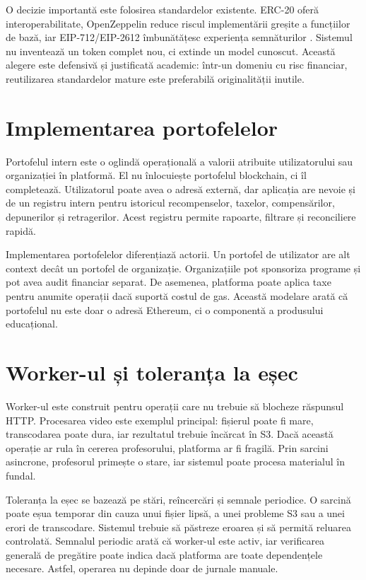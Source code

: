 O decizie importantă este folosirea standardelor existente. ERC-20 oferă interoperabilitate, OpenZeppelin reduce riscul implementării greșite a funcțiilor de bază, iar EIP-712/EIP-2612 îmbunătățesc experiența semnăturilor \cite{openzeppelinERC20,eip712,eip2612}. Sistemul nu inventează un token complet nou, ci extinde un model cunoscut. Această alegere este defensivă și justificată academic: într-un domeniu cu risc financiar, reutilizarea standardelor mature este preferabilă originalității inutile.

\section{Implementarea portofelelor}
Portofelul intern este o oglindă operațională a valorii atribuite utilizatorului sau organizației în platformă. El nu înlocuiește portofelul blockchain, ci îl completează. Utilizatorul poate avea o adresă externă, dar aplicația are nevoie și de un registru intern pentru istoricul recompenselor, taxelor, compensărilor, depunerilor și retragerilor. Acest registru permite rapoarte, filtrare și reconciliere rapidă.

Implementarea portofelelor diferențiază actorii. Un portofel de utilizator are alt context decât un portofel de organizație. Organizațiile pot sponsoriza programe și pot avea audit financiar separat. De asemenea, platforma poate aplica taxe pentru anumite operații dacă suportă costul de gas. Această modelare arată că portofelul nu este doar o adresă Ethereum, ci o componentă a produsului educațional.

\section{Worker-ul și toleranța la eșec}
Worker-ul este construit pentru operații care nu trebuie să blocheze răspunsul HTTP. Procesarea video este exemplul principal: fișierul poate fi mare, transcodarea poate dura, iar rezultatul trebuie încărcat în S3. Dacă această operație ar rula în cererea profesorului, platforma ar fi fragilă. Prin sarcini asincrone, profesorul primește o stare, iar sistemul poate procesa materialul în fundal.

Toleranța la eșec se bazează pe stări, reîncercări și semnale periodice. O sarcină poate eșua temporar din cauza unui fișier lipsă, a unei probleme S3 sau a unei erori de transcodare. Sistemul trebuie să păstreze eroarea și să permită reluarea controlată. Semnalul periodic arată că worker-ul este activ, iar verificarea generală de pregătire poate indica dacă platforma are toate dependențele necesare. Astfel, operarea nu depinde doar de jurnale manuale.

